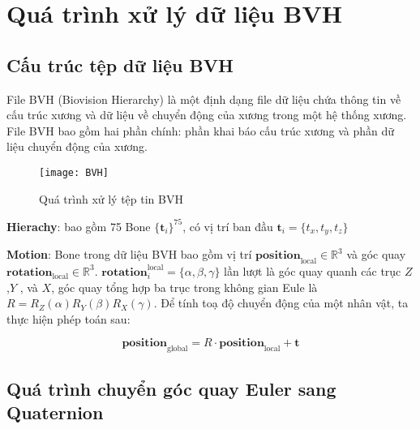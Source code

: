 \chapter{Quá trình xử lý dữ liệu BVH}
\label{Appendix2}

\section{Cấu trúc tệp dữ liệu BVH}

File BVH (Biovision Hierarchy) là một định dạng file dữ liệu chứa thông tin về cấu trúc xương và dữ liệu về chuyển động của xương trong một hệ thống xương. File BVH bao gồm hai phần chính: phần khai báo cấu trúc xương và phần dữ liệu chuyển động của xương. 

\setcounter{figure}{15}
\begin{figure}
	\centering
	\texttt{[image: BVH]}
	\caption{Quá trình xử lý tệp tin BVH}
	\label{fig:BVH}
\end{figure}


	\textbf{Hierachy}: bao gồm 75 Bone $\{ \mathbf{t}_i \}^{75} $, có vị trí ban đầu  $\mathbf{t}_{i} = \{t_x, t_y, t_z\}$

\vspace{5pt}

\textbf{Motion}:
Bone trong dữ liệu BVH bao gồm vị trí $\mathbf{position}_{\operatorname{local}}  \in \mathbb{R}^{3}$ và góc quay $\mathbf{rotation}_{\operatorname{local}} \in \mathbb{R}^{3}$.
$\mathbf{rotation}_i^{\operatorname{local}} = \{ \alpha ,\beta , \gamma \}$ lần lượt là góc quay quanh các trục $Z$ ,$Y$ , và $X$, góc quay tổng hợp ba trục trong không gian Eule là $R = R_Z(\alpha) R_Y(\beta) R_X(\gamma)$.
Để tính toạ độ chuyển động của một nhân vật, ta thực hiện phép toán sau:

\begin{equation}
	\mathbf{position}_{\text{global}} = R \cdot \mathbf{position}_{\text{local}} + \mathbf{t}
\end{equation}


\section{Quá trình chuyển góc quay Euler sang Quaternion}



